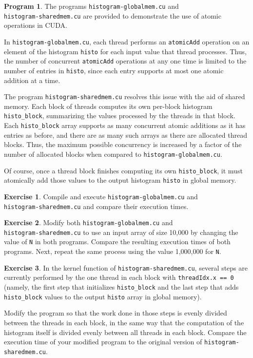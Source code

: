 \documentclass{article}
\theoremstyle{definition}
\newtheorem{program}{Program}
\newtheorem{exercise}{Exercise}
\begin{document}
\begin{program}
The programs \texttt{histogram-globalmem.cu} and \\ \texttt{histogram-sharedmem.cu} are provided to demonstrate the use of atomic operations in CUDA.

In \texttt{histogram-globalmem.cu}, each thread performs an \texttt{atomicAdd} operation on an element of the histogram \texttt{histo} for each input value that thread processes. Thus, the number of concurrent \texttt{atomicAdd} operations at any one time is limited to the number of entries in \texttt{histo}, since each entry supports at most one atomic addition at a time.

The program \texttt{histogram-sharedmem.cu} resolves this issue with the aid of shared memory. Each block of threads computes its own per-block histogram \texttt{histo\_block}, summarizing the values processed by the threads in that block. Each \texttt{histo\_block} array supports as many concurrent atomic additions as it has entries as before, and there are as many such arrays as there are allocated thread blocks. Thus, the maximum possible concurrency is increased by a factor of the number of allocated blocks when compared to \texttt{histogram-globalmem.cu}.

Of course, once a thread block finishes computing its own \texttt{histo\_block}, it must atomically add those values to the output histogram \texttt{histo} in global memory. 
\end{program}

\begin{exercise}
Compile and execute \texttt{histogram-globalmem.cu} and\\
\texttt{histogram-sharedmem.cu} and compare their execution times. 
\end{exercise}

\begin{exercise}
Modify both \texttt{histogram-globalmem.cu} and\\
\texttt{histogram-sharedmem.cu} to use an input array of size 10,000 by changing the value of \texttt{N} in both programs. Compare the resulting execution times of both programs. Next, repeat the same process using the value 1,000,000 for \texttt{N}.
\end{exercise}

\begin{exercise}
In the kernel function of \texttt{histogram-sharedmem.cu},  several steps are currently performed by the one thread in each block with \texttt{threadIdx.x == 0} (namely, the first step that initializes \texttt{histo\_block} and the last step that adds \texttt{histo\_block} values to the output \texttt{histo} array in global memory). 

Modify the program so that the work done in those steps is evenly divided between the threads in each block, in the same way that the computation of the histogram itself is divided evenly between all threads in each block. Compare the execution time of your modified program to the original version of \texttt{histogram-sharedmem.cu}.
\end{exercise}
\end{document}
